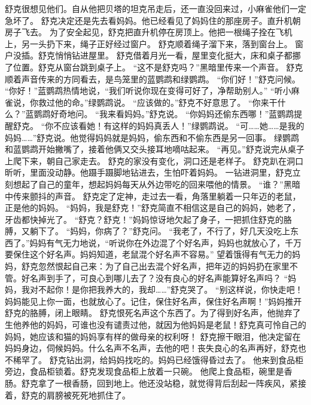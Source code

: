 \documentclass[a4paper,12pt,UTF8,twoside]{ctexbook}
\begin{document}
        舒克很想见他们。自从他把贝塔的坦克吊走后，还一直没回来过，小麻雀他们一定急坏了。 
        舒克决定还是先去看妈妈。他已经看见了妈妈住的那座房子。直升机朝房子飞去。 
        为了安全起见，舒克把直升机停在房顶上。他把一根绳子拴在飞机上，另一头扔下来，绳子正好经过窗户。 
        舒克顺着绳子溜下来，落到窗台上。 
        窗户没插。舒克悄悄钻进屋里。 
        舒克借着月光一看，屋里变化挺大，床和桌子都挪了位置。舒克从窗台跳到桌子上。 
        “这不是舒克吗？”黑暗里传来一个声音。 
        舒克顺着声音传来的方同看去，是鸟笼里的蓝鹦鹉和绿鹦鹉。 
        “你们好！”舒克问候。 
        “你好！”蓝鹦鹉热情地说，“我们听说你现在变得可好了，净帮助别人。” 
        “听小麻雀说，你救过他的命。”绿鹦鹉说。 
        “应该做的。”舒克不好意思了。 
        “你来干什么？”蓝鹦鹉好奇地问。 
        “我来看妈妈。”舒克说。 
        “你妈妈还偷东西哪！”蓝鹦鹉提醒舒克。 
        “你不应该看她！有这样的妈妈真丢人！”绿鹦鹉说。 
        “可……她……是我的妈妈……”舒克说。他觉得妈妈就是妈妈，偷东西和不偷东西是另一回事。 
        绿鹦鹉和蓝鹦鹉开始撇嘴了，接着他俩又交头接耳地嘀咕起来。 
        “再见。”舒克说完从桌子上爬下来，朝自己家走去。 
        舒克的家没有变化，洞口还是老样子。 
        舒克趴在洞口昕听，里面没动静。他蹑手蹑脚地钻进去，生怕吓着妈妈。 
        一钻进洞里，舒克立刻想起了自己的童年，想起妈妈每天从外边带吃的回来喂他的情景。 
        “谁？”黑暗中传来颤抖的声音。 
        舒克定了定神，走过去一看，角落里躺着一只年迈的老鼠，正是他的妈妈。 
        “妈妈，我是舒克！”舒克简直不相信这是自己的妈妈，她老了，牙齿都快掉光了。 
        “舒克？舒克！”妈妈惊讶地欠起了身子，一把抓住舒克的胳膊，又躺下了。 
        “妈妈，你病了？”舒克问。 
        “我老了，不行了，好几天没吃上东西了。”妈妈有气无力地说，“听说你在外边混了个好名声，妈妈也就放心了，千万要保住这个好名声。妈妈知道，老鼠混个好名声不容易。” 
        望着饿得有气无力的妈妈，舒克忽然恨起自己来：为了自己出去混个好名声，把年迈的妈妈扔在家里不管。好名声到手了，可良心到哪儿去了？没有良心的好名声能算好名声吗？ 
        “妈妈，我对不起你！是你把我养大的，我却……”舒克哭了。 
        “别这样说，你快走吧！妈妈能见上你一面，也就放心了。记住，保住好名声，保住好名声啊！”妈妈推开舒克的胳膊，闭上眼睛。 
        舒克恨死名声这个东西了。为了得到好名声，他抛弃了生他养他的妈妈，可谁也没有谴责过他，就因为他妈妈是老鼠！舒克真可怜自己的妈妈，她应该和猫的妈妈享有样的做母亲的权利呀！ 
        舒克擦干眼泪，他决定留在妈妈身边，伺候妈妈。什么名声不名声，去他的吧！丧失良心的名声再好，舒克也不稀罕了。 
        舒克钻出洞，给妈妈找吃的。妈妈已经饿得昏过去了。 
        他来到食品柜旁边，食品柜锁着。舒克发现食品柜上放着一只碗。 
        他爬上食品柜，碗里是香肠。舒克拿了一根香肠，回到地上。他还没站稳，就觉得背后刮起一阵疾风，紧接着，舒克的肩膀被死死地抓住了。 
\end{document}
